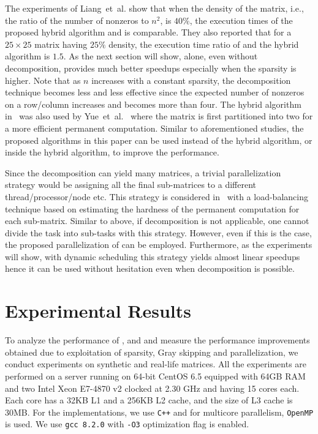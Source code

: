 \documentclass{elektr}
\begin{document}
{The experiments of Liang~et~al. show that when the density of the matrix, i.e., the ratio of the number of nonzeros to $n^2$, is $40\%$, the execution times of the proposed hybrid algorithm
and {} is comparable. They also reported that for a $25 \times 25$ matrix having $25\%$ density, the execution time ratio of 
{} and the hybrid algorithm is $1.5$. 
As the next section will show, {} alone, even without decomposition, provides much
better speedups especially when the sparsity is higher. Note that as $n$ increases with a constant sparsity, the decomposition technique becomes less and less effective 
since the expected number of nonzeros on a row/column increases and becomes more than four. 
The hybrid algorithm in~\cite{liang06} was also used by Yue~et~al.~\cite{yue13} where the matrix is first partitioned into two for a more
efficient permanent computation. Similar to aforementioned studies, the proposed 
algorithms in this paper can be used instead of the hybrid algorithm, or inside the hybrid algorithm, to improve the performance.  

Since the decomposition can yield many matrices, a trivial parallelization strategy would be assigning all the final sub-matrices to a different thread/processor/node etc. 
This strategy is considered in~\cite{Wang2012ALB} with a load-balancing technique based on estimating the hardness of the permanent computation for each sub-matrix. Similar to above, if decomposition 
is not applicable, one cannot divide the task into sub-tasks with this strategy. However, even if this is the case, the proposed parallelization of {} can be employed. Furthermore, as the experiments will show,
with dynamic scheduling this strategy yields almost linear speedups hence it can be used without hesitation even when decomposition is possible.

\section{Experimental Results}\label{sec:exp}

To analyze the performance of {}, {} and {} and measure the performance improvements obtained due to exploitation of sparsity, Gray skipping and parallelization, we conduct experiments on   synthetic and real-life matrices. All the experiments are performed on a server running on 64-bit CentOS 6.5 equipped with 64GB RAM and two
Intel Xeon E7-4870 v2 clocked at 2.30 GHz and having 15 cores each. Each core has a 32KB L1 and a 256KB L2 cache, and the size of L3 cache is 30MB. For the implementations, we use {\tt C++} and for multicore parallelism, {\tt OpenMP} is used. We use {\tt gcc 8.2.0} with {\tt -O3} optimization flag is enabled.

}
\end{document}
